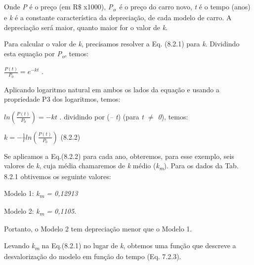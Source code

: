 \documentclass[12pt]{article}
\begin{document}
\vspace{\baselineskip}
Onde \textit{P} é o preço (em R$\$$ x1000), \textit{P\textsubscript{o}\  }é o preço do carro novo, \textit{t} é o tempo (anos) e \textit{k} é a constante característica da depreciação, de cada modelo de carro. A depreciação será maior, quanto maior for o valor de \textit{k}. \par


\vspace{\baselineskip}
Para calcular o valor de \textit{k}, precisamos resolver a Eq. (8.2.1) para \textit{k}. Dividindo esta equação por \textit{P\textsubscript{o}}, temos:\par


\vspace{\baselineskip}
 \( \frac{P \left( t \right) }{P_{0}}=e^{-kt} \) .\  \par

Aplicando logaritmo natural em ambos os lados da equação e usando a propriedade P3 dos logaritmos, temos:\par


\vspace{\baselineskip}
 \( ln \left( \frac{P \left( t \right) }{P_{0}} \right) =-kt  \) . dividindo por (\textit{– t}) (para \textit{t $ \neq $  0}), temos:\par


\vspace{\baselineskip}
 \( k=-\frac{1}{t}ln \left( \frac{P \left( t \right) }{P_{0}} \right)  \) \tab \tab \tab \tab \tab \tab \tab (8.2.2)\par


\vspace{\baselineskip}

\vspace{\baselineskip}
Se aplicamos a Eq.(8.2.2) para cada ano, obteremos, para esse exemplo, seis valores de \textit{k}, cuja média chamaremos de \textit{k} médio (\textit{k\textsubscript{m}}). Para os dados da Tab. 8.2.1 obtivemos os seguinte valores:\par

\tab Modelo 1: \textit{k\textsubscript{m} = 0,12913}\par

\tab Modelo 2: \textit{k\textsubscript{m} = 0,1105}.\par

Portanto, o Modelo 2 tem depreciação menor que o Modelo 1.\par


\vspace{\baselineskip}
Levando \textit{k\textsubscript{m}} na Eq.(8.2.1) no lugar de \textit{k}, obtemos uma função que descreve a desvalorização do modelo em função do tempo (Eq. 7.2.3).\par
\end{document}

